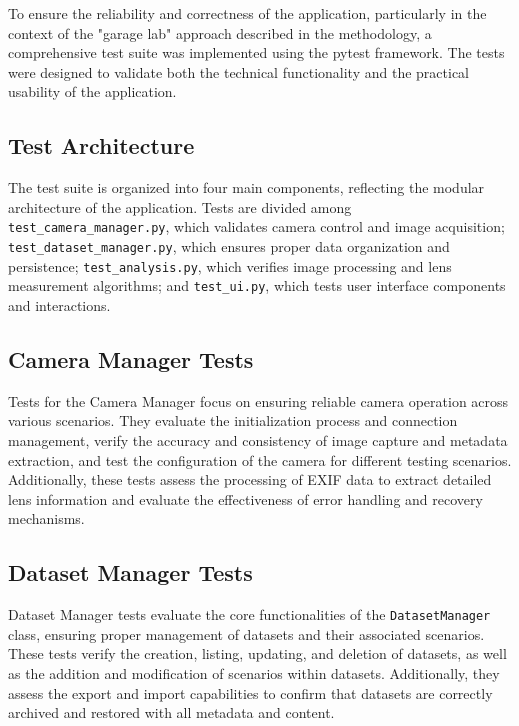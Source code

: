 To ensure the reliability and correctness of the application, particularly in the context of the "garage lab" approach described in the methodology, a comprehensive test suite was implemented using the pytest framework. The tests were designed to validate both the technical functionality and the practical usability of the application.

\subsection{Test Architecture}

The test suite is organized into four main components, reflecting the modular architecture of the application. Tests are divided among \texttt{test\_camera\_manager.py}, which validates camera control and image acquisition; \texttt{test\_dataset\_manager.py}, which ensures proper data organization and persistence; \texttt{test\_analysis.py}, which verifies image processing and lens measurement algorithms; and \texttt{test\_ui.py}, which tests user interface components and interactions.

\subsection{Camera Manager Tests}

Tests for the Camera Manager focus on ensuring reliable camera operation across various scenarios. They evaluate the initialization process and connection management, verify the accuracy and consistency of image capture and metadata extraction, and test the configuration of the camera for different testing scenarios. Additionally, these tests assess the processing of EXIF data to extract detailed lens information and evaluate the effectiveness of error handling and recovery mechanisms.

\subsection{Dataset Manager Tests}

Dataset Manager tests evaluate the core functionalities of the \texttt{DatasetManager} class, ensuring proper management of datasets and their associated scenarios. These tests verify the creation, listing, updating, and deletion of datasets, as well as the addition and modification of scenarios within datasets. Additionally, they assess the export and import capabilities to confirm that datasets are correctly archived and restored with all metadata and content.

